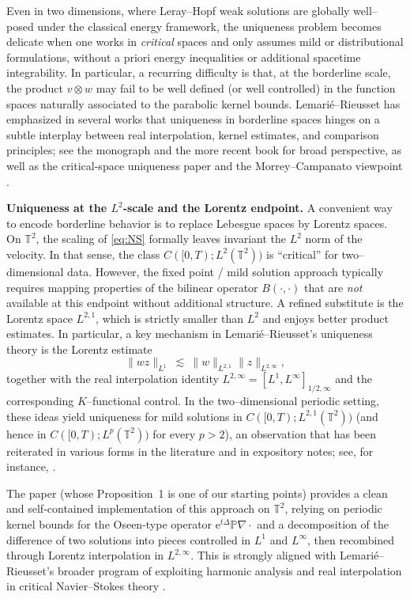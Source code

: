 \documentclass[12pt]{article}
\newcommand{\T}{\mathbb{T}}
\theoremstyle{remark}
\theoremstyle{remark}
\begin{document}
Even in two dimensions, where Leray--Hopf weak solutions are globally well--posed under
the classical energy framework, the uniqueness problem becomes delicate when one
works in \emph{critical} spaces and only assumes mild or distributional formulations,
without a priori energy inequalities or additional spacetime integrability. In particular,
a recurring difficulty is that, at the borderline scale, the product $v\otimes w$ may fail
to be well defined (or well controlled) in the function spaces naturally associated to the
parabolic kernel bounds. Lemari\'e--Rieusset has emphasized in several works that uniqueness
in borderline spaces hinges on a subtle interplay between real interpolation, kernel estimates,
and comparison principles; see the monograph \cite{LemarieBook2002} and the more recent
book \cite{LemarieBook2023} for broad perspective, as well as the critical-space uniqueness
paper \cite{LemarieChemin2007} and the Morrey--Campanato viewpoint \cite{LemarieMorrey2007}.

\medskip

\noindent\textbf{Uniqueness at the $L^2$-scale and the Lorentz endpoint.}
A convenient way to encode borderline behavior is to replace Lebesgue spaces by Lorentz spaces.
On $\T^2$, the scaling of \eqref{eq:NS} formally leaves invariant the $L^2$ norm of the velocity.
In that sense, the class $C([0,T);L^2(\T^2))$ is ``critical'' for two--dimensional data.
However, the fixed point / mild solution approach typically requires mapping properties of the
bilinear operator $B(\cdot,\cdot)$ that are \emph{not} available at this endpoint without additional structure.
A refined substitute is the Lorentz space $L^{2,1}$, which is strictly smaller than $L^2$ and enjoys
better product estimates. In particular, a key mechanism in Lemari\'e--Rieusset's uniqueness theory
is the Lorentz estimate
\begin{equation}\label{eq:LR-idea}
\|wz\|_{L^1}\ \lesssim\ \|w\|_{L^{2,1}}\|z\|_{L^{2,\infty}},
\end{equation}
together with the real interpolation identity $L^{2,\infty}=[L^1,L^\infty]_{1/2,\infty}$ and
the corresponding $K$--functional control.
In the two--dimensional periodic setting, these ideas yield uniqueness for mild solutions in
$C([0,T);L^{2,1}(\T^2))$ (and hence in $C([0,T);L^p(\T^2))$ for every $p>2$), an observation that
has been reiterated in various forms in the literature and in expository notes; see, for instance,
\cite{LemarieBook2002,HeNote2024}.

The paper \cite{LemarieRieusset2025HighlySingular} (whose Proposition~1 is one of our starting points) provides a clean and
self-contained implementation of this approach on $\T^2$, relying on periodic kernel bounds for the
Oseen-type operator $\mathrm{e}^{t\Delta}\mathbb{P}\nabla\cdot$ and a decomposition of the difference
of two solutions into pieces controlled in $L^1$ and $L^\infty$, then recombined through Lorentz
interpolation in $L^{2,\infty}$. This is strongly aligned with Lemari\'e--Rieusset's broader program
of exploiting harmonic analysis and real interpolation in critical Navier--Stokes theory
\cite{LemarieBook2002,LemarieMorrey2007}.
\end{document}
